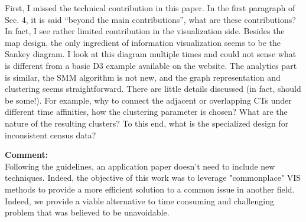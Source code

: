 \documentclass{article}
\newcommand{\reply}[1]{\begin{tcolorbox}\noindent\textbf{Comment:}\\#1\hfill\end{tcolorbox}}
\begin{document}
\begin{itemize}
{{    First, I missed the technical contribution in this paper. In the first paragraph
    of Sec. 4, it is said ``beyond the main contributions'', what are these
    contributions? In fact, I see rather limited contribution in the visualization
    side. Besides the map design, the only ingredient of information visualization
    seems to be the Sankey diagram. I look at this diagram multiple times and could
    not sense what is different from a basic D3 example available on the website. The
    analytics part is similar, the SMM algorithm is not new, and the graph
    representation and clustering seems straightforward. There are little details
    discussed (in fact, should be some!). For example, why to connect the adjacent or
    overlapping CTs under different time affinities, how the clustering parameter is
    chosen? What are the nature of the resulting clusters? To this end, what is the
    specialized design for inconsistent census data?

    \reply{Following the guidelines, an application paper doesn't need to
    include new techniques. Indeed, the objective of this work was to leverage
    "commonplace" VIS methods to provide a more efficient solution to a common
    issue in another field. Indeed, we provide a viable alternative to time
    consuming and challenging problem that was believed to be unavoidable.}}


}
\end{itemize}
\end{document}
